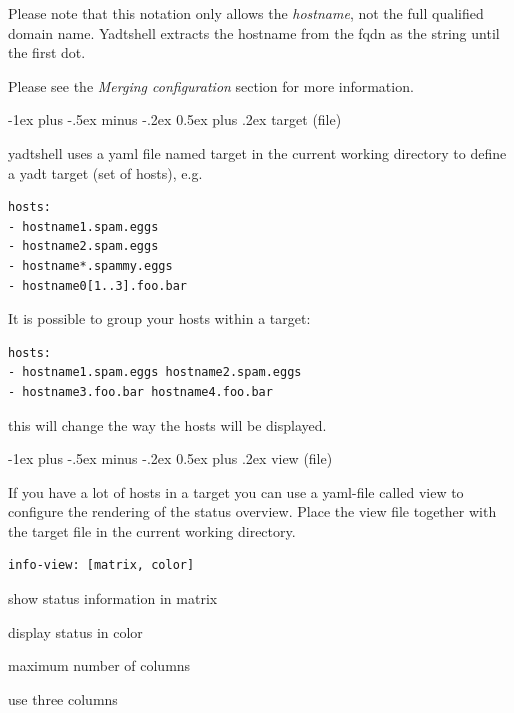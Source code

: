 \documentclass[10pt,landscape]{article}
\makeatletter
\renewcommand{\section}{\@startsection{section}{1}{0mm}%
                                {-1ex plus -.5ex minus -.2ex}%
                                {0.5ex plus .2ex}%
                                {\normalfont\large\bfseries}}
\makeatother
\begin{document}
\begin{multicols}{3}
Please note that this notation only allows the \emph{hostname},
not the full qualified domain name. Yadtshell extracts the hostname from
the fqdn as the string until the first dot.

Please see the \emph{Merging configuration} section for more information.



\section{target (file)}

yadtshell uses a yaml file named target in the current working directory to define a yadt target (set of hosts), e.g.

\begin{lstlisting}
hosts:
- hostname1.spam.eggs
- hostname2.spam.eggs
- hostname*.spammy.eggs
- hostname0[1..3].foo.bar
\end{lstlisting}

It is possible to group your hosts within a target:

\begin{lstlisting}
hosts:
- hostname1.spam.eggs hostname2.spam.eggs
- hostname3.foo.bar hostname4.foo.bar
\end{lstlisting}

this will change the way the hosts will be displayed.



\section{view (file)}

If you have a lot of hosts in a target you can use a yaml-file
called view to configure the rendering of the status overview.
Place the view file together with the target file in the current
working directory.

\begin{lstlisting}
info-view: [matrix, color]
\end{lstlisting}

\begin{description}[font=\bfseries,leftmargin=1.5cm,style=sameline]
    \item [matrix]  show status information in matrix
    \item[color]    display status in color
    \item[maxcols]  maximum number of columns
    \item[3cols]    use three columns
\end{description}




\end{multicols}
\end{document}
